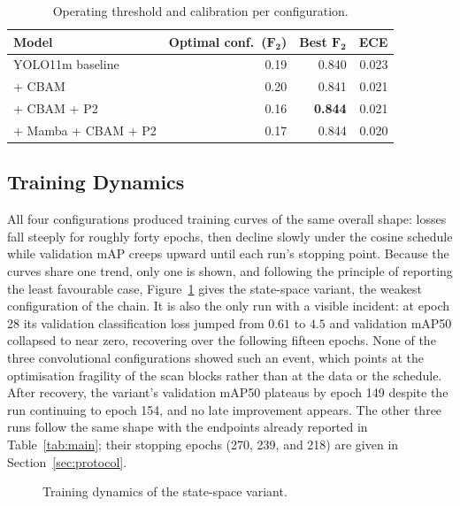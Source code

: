 \begin{table}[H]
  \centering
  \caption{Operating threshold and calibration per configuration.}
  \label{tab:thrcal}
  \begin{tabular}{@{}l r r r@{}}
    \toprule
    \textbf{Model} & \textbf{Optimal conf.\ ($\symbf{F_2}$)} & \textbf{Best $\symbf{F_2}$} & \textbf{ECE} \\
    \midrule
    YOLO11m baseline    & 0.19 & 0.840 & 0.023 \\
    + CBAM              & 0.20 & 0.841 & 0.021 \\
    + CBAM + P2         & 0.16 & \textbf{0.844} & 0.021 \\
    + Mamba + CBAM + P2 & 0.17 & 0.844 & 0.020 \\
    \bottomrule
  \end{tabular}
\end{table}

\subsection{Training Dynamics}
All four configurations produced training curves of the same overall shape:
losses fall steeply for roughly forty epochs, then decline slowly under the
cosine schedule while validation mAP creeps upward until each run's stopping
point. Because the curves share one trend, only one is shown, and following
the principle of reporting the least favourable case, Figure~\ref{fig:training}
gives the state-space variant, the weakest configuration of the chain. It is
also the only run with a visible incident: at epoch 28 its validation
classification loss jumped from $0.61$ to $4.5$ and validation mAP50 collapsed
to near zero, recovering over the following fifteen epochs. None of the three
convolutional configurations showed such an event, which points at the
optimisation fragility of the scan blocks rather than at the data or the
schedule. After recovery, the variant's validation mAP50 plateaus by epoch
149 despite the run continuing to epoch 154, and no late improvement appears. The other three runs follow the same
shape with the endpoints already reported in Table~\ref{tab:main}; their
stopping epochs (270, 239, and 218) are given in Section~\ref{sec:protocol}.

\begin{figure}[H]
  \centering
  \caption{Training dynamics of the state-space variant.}
  \label{fig:training}
\end{figure}

